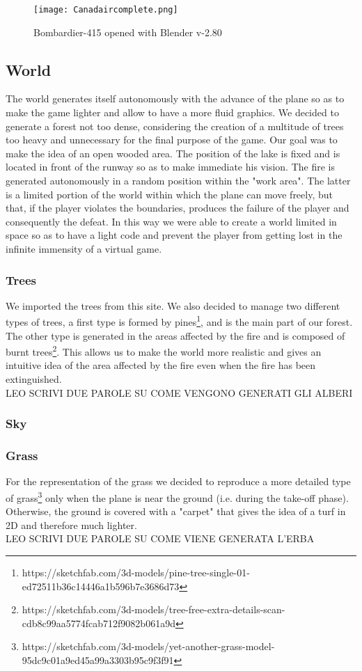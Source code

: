 \documentclass{article}
\begin{document}
\begin{figure}[h!]
  \texttt{[image: Canadaircomplete.png]}
  \caption{Bombardier-415 opened with Blender v-2.80}
\end{figure}
 
\subsection*{World}
The world generates itself autonomously with the advance of the plane so as to make the game lighter and allow to have a more fluid graphics. We decided to generate a forest not too dense, considering the creation of a multitude of trees too heavy and unnecessary for the final purpose of the game. Our goal was to make the idea of an open wooded area. The position of the lake is fixed and is located in front of the runway so as to make immediate his vision. The fire is generated autonomously in a random position within the "work area". The latter is a limited portion of the world within which the plane can move freely, but that, if the player violates the boundaries, produces the failure of the player and consequently the defeat. In this way we were able to create a world limited in space so as to have a light code and prevent the player from getting lost in the infinite immensity of a virtual game.

\subsubsection*{Trees}
We imported the trees from this site. We also decided to manage two different types of trees, a first type is formed by pines\footnote{https://sketchfab.com/3d-models/pine-tree-single-01-ed72511b36c14446a1b596b7e3686d73}, and is the main part of our forest. The other type is generated in the areas affected by the fire and is composed of burnt trees\footnote{https://sketchfab.com/3d-models/tree-free-extra-details-scan-cdb8c99aa5774fcab712f9082b061a9d}. This allows us to make the world more realistic and gives an intuitive idea of the area affected by the fire even when the fire has been extinguished. \\
LEO SCRIVI DUE PAROLE SU COME VENGONO GENERATI GLI ALBERI

\subsubsection*{Sky}

\subsubsection*{Grass}
For the representation of the grass we decided to reproduce a more detailed type of grass\footnote{https://sketchfab.com/3d-models/yet-another-grass-model-95dc9c01a9ed45a99a3303b95c9f3f91} only when the plane is near the ground (i.e. during the take-off phase). Otherwise, the ground is covered with a "carpet" that gives the idea of a turf in 2D and therefore much lighter. \\
LEO SCRIVI DUE PAROLE SU COME VIENE GENERATA L'ERBA
\end{document}
